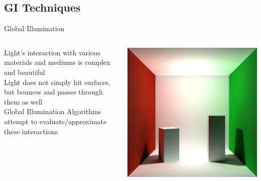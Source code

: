 \documentclass[10pt,compress,professionalfont]{beamer}
\begin{document}
\subsection{GI Techniques}
\begin{frame}{Global Illumination}

    \begin{columns}
        \begin{column}{0.55\textwidth}
	    Light's interaction with various materials and mediums is complex and beautiful\\
	    \vspace{6mm}
	    Light does not simply hit surfaces, but bounces and passes through them as well\\
            \vspace{6mm}
            Global Illumination Algorithms attempt to evaluate/approximate these interactions\\
        \end{column}
        \begin{column}{0.45\textwidth}
            {\centering
                \vspace{-4mm}
                \includegraphics[width=\textwidth]{../img/indirect_box_high}
            }
        \end{column}
    \end{columns}

\end{frame}
\end{document}
